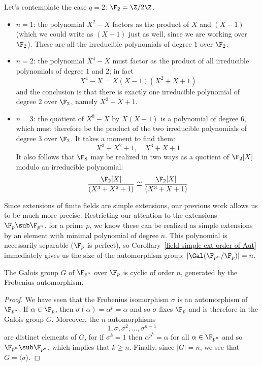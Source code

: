 \begin{example}
Let's contemplate the case $q=2$: $\F_2=\Z/2\Z$.
\begin{itemize}
\item $n=1$: the polynomial $X^2-X$ factors as the product of $X$ and $(X-1)$ (which we could write as $(X+1)$ just as well, since we are working over $\F_2$). These are all the irreducible polynomials of degree $1$ over $\F_2$.
\item $n=2$: the polynomial $X^4-X$ must factor as the product of all irreducible polynomials of degree $1$ and $2$; in fact
\[X^4-X=X(X-1)(X^2+X+1)\]
and the conclusion is that there is exactly one irreducible polynomial of degree $2$ over $\F_2$, namely $X^2+X+1$.
\item $n=3$: the quotient of $X^8-X$ by $X(X-1)$ is a polynomial of degree $6$, which must therefore be the product of the two irreducible polynomials of degree $3$ over $\F_2$. It takes a moment to find them:
\[X^3+X^2+1,\quad X^3+X+1\]
It also follows that $\F_8$ may be realized in two ways as a quotient of $\F_2[X]$ modulo an irreducible polynomial:
\[\dfrac{\F_2[X]}{(X^3+X^2+1)}\cong\dfrac{\F_2[X]}{(X^3+X+1)}\]
\end{itemize}
\end{example}
Since extensions of finite fields are simple extensions, our previous work allows us to be much more precise. Restricting our attention to the extensions $\F_p\sub\F_{p^n}$, for a prime $p$, we know these can be realized as simple extensions by an element with minimal polynomial of degree $n$. This polynomial is necessarily separable ($\F_p$ is perfect), so Corollary~\ref{field simple ext order of Aut} immediately gives us the size of the automorphism group: $|\Gal(\F_{p^n}/\F_p)|=n$.
\begin{proposition}\label{finite field Galois generated by Frobenius}
The Galois group $G$ of $\F_{p^n}$ over $\F_p$ is cyclic of order $n$, generated by the Frobenius automorphism.
\end{proposition}
\begin{proof}
We have seen that the Frobenius isomorphism $\sigma$ is an automorphism of $\F_{p^n}$. If $\alpha\in\F_{p}$, then $\sigma(\alpha)=\alpha^p=\alpha$ and so $\sigma$ fixes $\F_{p}$ and is therefore in the Galois group $G$. Moreover, the $n$ automorphisms
\[1,\sigma,\sigma^2,\dots,\sigma^{n-1}\]
are distinct elements of $G$, for if $\sigma^k=1$ then $\alpha^{p^k}=\alpha$ for all $\alpha\in\F_{p^n}$ and so $\F_{p^n}\sub\F_{p^d}$, which implies that $k\geq n$. Finally, since $|G|=n$, we see that $G=\langle\sigma\rangle$.
\end{proof}
